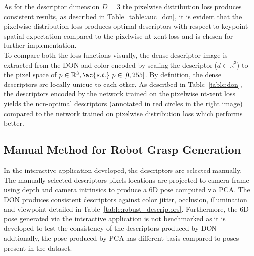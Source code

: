 As for the descriptor dimension $D=3$ the pixelwise distribution loss produces consistent results, as described in Table~\ref{table:auc_don}, it is evident that the pixelwise distribution loss produces
optimal descriptors with respect to keypoint spatial expectation compared to the pixelwise nt-xent loss and is chosen for further implementation.\\

To compare both the loss
functions visually, the dense descriptor image is extracted from the \ac{DON} and color encoded by scaling the descriptor ($d \in \mathbb{R}^3$) to the pixel space of $p \in \mathbb{R}^3, \ac{s.t.} \ p \in [0, 255]$. By definition, the dense descriptors are locally
unique to each other. As described in Table~\ref{table:don}, the descriptors encoded by the network trained on the pixelwise nt-xent loss yields the non-optimal descriptors (annotated in red circles in the right image)
compared to the network trained on pixelwise distribution loss which performs better.


\subsection{Manual Method for Robot Grasp Generation}

In the interactive application developed, the descriptors are selected manually. The manually selected descriptors pixels locations are projected to camera frame using depth and camera intrinsics to
produce a 6D pose computed via \ac{PCA}. The \ac{DON} produces consistent descriptors against color jitter, occlusion, illumination and viewpoint detailed in Table~\ref{table:robust_descriptors}. Furthermore, the
6D pose generated via the interactive application is not benchmarked as it is developed to test the consistency of the descriptors produced by \ac{DON} addtionally, the pose produced by \ac{PCA} has different
basis compared to poses present in the dataset.

